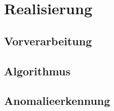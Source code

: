
\chapter{Realisierung}\label{ch:realisierung}
\section{Vorverarbeitung}

\section{Algorithmus}

\section{Anomalieerkennung}

